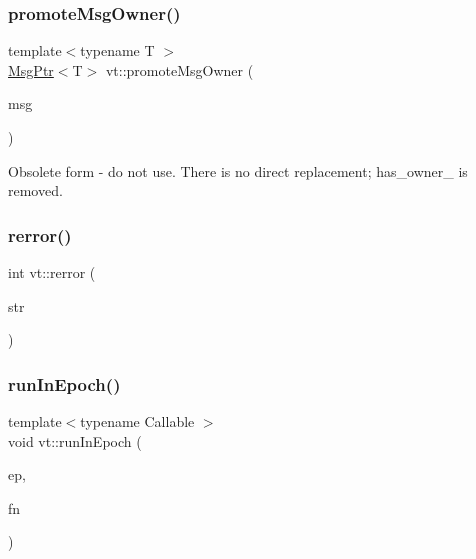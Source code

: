 \subsubsection{\texorpdfstring{promote\+Msg\+Owner()}{promoteMsgOwner()}}
{\footnotesize\ttfamily template$<$typename T $>$ \\
\hyperlink{namespacevt_a9f5ebd62ee9d6dd8829e3e1cc4f858e9}{Msg\+Ptr}$<$T$>$ vt\+::promote\+Msg\+Owner (\begin{DoxyParamCaption}\item[{T $\ast$const}]{msg }\end{DoxyParamCaption})\hspace{0.3cm}{\ttfamily [inline]}}

Obsolete form -\/ do not use. There is no direct replacement; has\+\_\+owner\+\_\+ is removed. \mbox{\label{namespacevt_aff96ace008dc847d4c0f44cfa5dfb3a0}} 
\subsubsection{\texorpdfstring{rerror()}{rerror()}}
{\footnotesize\ttfamily int vt\+::rerror (\begin{DoxyParamCaption}\item[{char const $\ast$}]{str }\end{DoxyParamCaption})}

\mbox{\label{namespacevt_ab95230c4145a8f4fb6874188eda37991}} 
\subsubsection{\texorpdfstring{run\+In\+Epoch()}{runInEpoch()}}
{\footnotesize\ttfamily template$<$typename Callable $>$ \\
void vt\+::run\+In\+Epoch (\begin{DoxyParamCaption}\item[{\hyperlink{namespacevt_a81d11b28122d43bf9834577e4a06440f}{Epoch\+Type}}]{ep,  }\item[{Callable \&\&}]{fn }\end{DoxyParamCaption})}

\mbox{\label{namespacevt_a2fc4ef34f30b49a1781d765804bfadbb}} 
